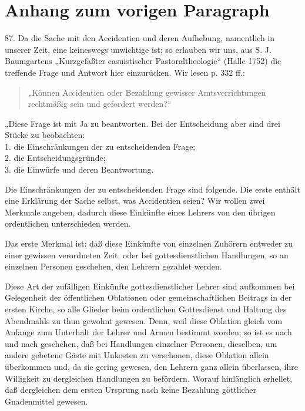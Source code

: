 \section{Anhang zum vorigen Paragraph}

87. Da die Sache mit den Accidentien und deren Aufhebung, namentlich in unserer Zeit, eine keineswegs unwichtige ist; so erlauben wir uns, aus S. J. Baumgartens „Kurzgefaßter casuistischer Pastoraltheologie“ (Halle 1752) die treffende Frage und Antwort hier einzurücken. Wir lesen p. 332 ff.:

\begin{quote}
„Können Accidentien oder Bezahlung gewisser Amtsverrichtungen rechtmäßig sein und gefordert werden?“
\end{quote}

„Diese Frage ist mit Ja zu beantworten. Bei der Entscheidung aber sind drei Stücke zu beobachten:\\
1. die Einschränkungen der zu entscheidenden Frage;\\
2. die Entscheidungsgründe;\\
3. die Einwürfe und deren Beantwortung.

Die Einschränkungen der zu entscheidenden Frage sind folgende. Die erste enthält eine Erklärung der Sache selbst, was Accidentien seien? Wir wollen zwei Merkmale angeben,
dadurch diese Einkünfte eines Lehrers von den übrigen ordentlichen unterschieden werden.

Das erste Merkmal ist: daß diese Einkünfte von einzelnen Zuhörern entweder zu einer gewissen verordneten Zeit, oder bei gottesdienstlichen Handlungen, so an einzelnen Personen geschehen, den Lehrern gezahlet werden.

Diese Art der zufälligen Einkünfte gottesdienstlicher Lehrer sind aufkommen bei Gelegenheit der öffentlichen Oblationen oder gemeinschaftlichen Beitrags in der ersten Kirche, so alle Glieder beim ordentlichen Gottesdienst und Haltung des Abendmahls zu thun gewohnt gewesen. Denn, weil diese Oblation gleich vom Anfange zum Unterhalt der Lehrer und Armen bestimmt worden; so ist es nach und nach geschehen, daß bei Handlungen einzelner Personen, dieselben, um andere gebetene Gäste mit Unkosten zu verschonen, diese Oblation allein überkommen und, da sie gering gewesen, den Lehrern ganz allein überlassen, ihre Willigkeit zu dergleichen Handlungen zu befördern. Worauf hinlänglich erhellet, daß dergleichen dem ersten Ursprung nach keine Bezahlung göttlicher Gnadenmittel gewesen.

